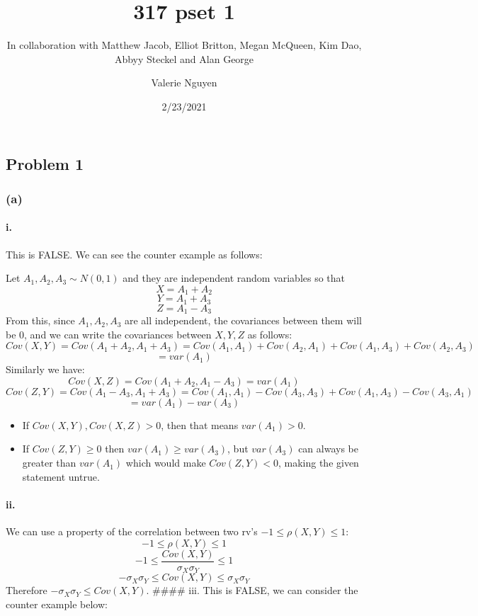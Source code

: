 \documentclass[]{article}
\title{317 pset 1}
\subtitle{In collaboration with Matthew Jacob, Elliot Britton, Megan McQueen, Kim
Dao, Abbyy Steckel and Alan George}
\author{Valerie Nguyen}
\date{2/23/2021}
\let\oldparagraph\paragraph
\renewcommand{\paragraph}[1]{\oldparagraph{#1}\mbox{}}
\begin{document}
\maketitle

\hypertarget{problem-1}{%
\subsection{Problem 1}\label{problem-1}}

\hypertarget{a}{%
\subsubsection{(a)}\label{a}}

\hypertarget{i.}{%
\paragraph{i.}\label{i.}}

This is FALSE. We can see the counter example as follows:

Let \(A_1, A_2, A_3 \sim N(0,1)\) and they are independent random
variables so that \[X = A_1 + A_2\] \[Y = A_1 + A_3\] \[Z = A_1 - A_3\]
From this, since \(A_1, A_2, A_3\) are all independent, the covariances
between them will be 0, and we can write the covariances between
\(X, Y, Z\) as follows:
\[Cov(X,Y) = Cov(A_1 + A_2, A_1 + A_3) = Cov(A_1, A_1) + Cov(A_2,A_1) + Cov(A_1, A_3) + Cov(A_2, A_3)\]
\[= var(A_1)\] Similarly we have:
\[Cov(X,Z) = Cov(A_1 + A_2, A_1 - A_3) = var(A_1)\]
\[Cov(Z, Y) = Cov(A_1 - A_3, A_1 + A_3) = Cov(A_1, A_1) - Cov(A_3, A_3) + Cov(A_1, A_3) - Cov(A_3, A_1)\]
\[= var(A_1) - var(A_3)\]

\begin{itemize}
\item
  If \(Cov(X,Y), Cov(X,Z) > 0\), then that means \(var(A_1) >0\).
\item
  If \(Cov(Z,Y) \geq 0\) then \(var(A_1) \geq var(A_3)\), but
  \(var(A_3)\) can always be greater than \(var(A_1)\) which would make
  \(Cov(Z,Y) < 0\), making the given statement untrue.
\end{itemize}

\hypertarget{ii.}{%
\paragraph{ii.}\label{ii.}}

We can use a property of the correlation between two rv's
\(-1 \leq \rho(X,Y) \leq 1\): \[-1 \leq \rho(X,Y) \leq 1\]
\[-1 \leq \frac{Cov(X,Y)}{\sigma_X \sigma_Y} \leq 1\]
\[- \sigma_X \sigma_Y \leq Cov(X,Y) \leq \sigma_X \sigma_Y\] Therefore
\(- \sigma_X \sigma_Y \leq Cov(X,Y)\). \#\#\#\# iii. This is FALSE, we
can consider the counter example below:
\end{document}
